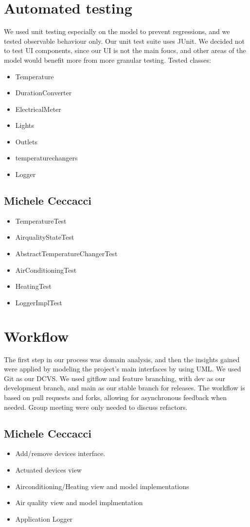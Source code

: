 \documentclass[a4paper,12pt]{report}
\begin{document}
\section{Automated testing}
We used unit testing especially on the model to prevent regressions, and we tested observable behaviour only.
Our unit test suite uses JUnit.
We decided not to test UI components, since our UI is not the main foucs,
and other areas of the model would benefit more from more granular testing. 
Tested classes:
\begin{itemize}
	\item Temperature
	\item DurationConverter
	\item ElectricalMeter
	\item Lights
	\item Outlets
	\item temperaturechangers
	\item Logger
\end{itemize}

\subsection{Michele Ceccacci}
\begin{itemize}
	\item TemperatureTest
	\item AirqualityStateTest
	\item AbstractTemperatureChangerTest
	\item AirConditioningTest
	\item HeatingTest
	\item LoggerImplTest
\end{itemize}



\section{Workflow}
The first step in our process was domain analysis, and then the insights gained were applied by modeling 
the project's main interfaces by using UML.
We used Git as our DCVS. We used gitflow and feature branching, with dev as our development branch,
and main as our stable branch for releases. The workflow is based on pull requests and forks, allowing for asynchronous feedback when needed.
Group meeting were only needed to discuss refactors. 

\subsection{Michele Ceccacci}
\begin{itemize}
	\item Add/remove devices interface.
	\item Actuated devices view
	\item Airconditioning/Heating view and model implementations
	\item Air quality view and model implmentation
	\item Application Logger 
\end{itemize}
\end{document}

